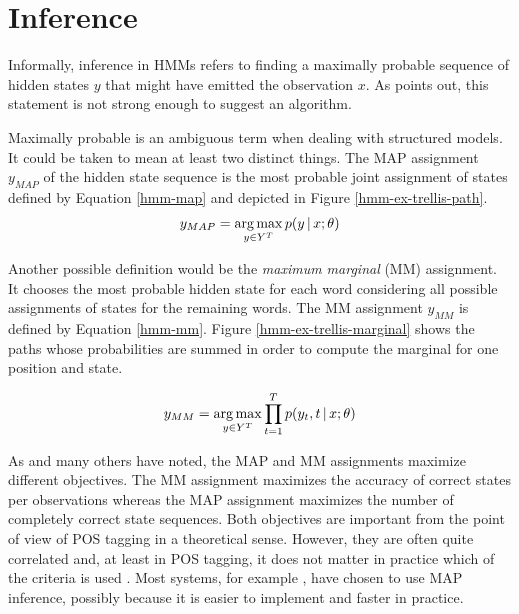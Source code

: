 \section{Inference}
Informally, inference in HMMs refers to finding a maximally
probable sequence of hidden states $y$ that might have emitted the
observation $x$. As \cite{Rabiner1989} points out, this statement is
not strong enough to suggest an algorithm. 

Maximally probable is an ambiguous term when dealing with structured
models. It could be taken to mean at least two distinct things. The
MAP assignment $y_{MAP}$ of the hidden state sequence is the most
probable joint assignment of states defined by Equation
\eqref{hmm-map} and depicted in Figure
\ref{hmm-ex-trellis-path}. 
\begin{equation}
y_{MAP} = \operatorname*{arg\,max}_{y\in Y^T} p(y\mbox{$ \, | \, $} x\mbox{$ ; \, $}\theta)\label{hmm-map}
\end{equation}

Another possible definition would be the
{\it maximum marginal} (MM) assignment. It chooses the most probable
hidden state for each word considering all possible assignments of states for the remaining words. The MM assignment $y_{MM}$ is defined by Equation
\eqref{hmm-mm}. Figure \ref{hmm-ex-trellis-marginal} shows the
paths whose probabilities are summed in order to compute the marginal for one position and state.


\begin{equation}
y_{MM} = \operatorname*{arg\,max}_{y\in Y^T} \prod_{t = 1}^T p(y_t, t \mbox{$ \, | \, $} x\mbox{$ ; \, $}\theta)\label{hmm-mm}
\end{equation}

As \cite{Merialdo1994} and many others have noted, the MAP and MM
assignments maximize different objectives. The MM assignment maximizes
the accuracy of correct states per observations whereas the MAP
assignment maximizes the number of completely correct state
sequences. Both objectives are important from the point of view of POS
tagging in a theoretical sense. However, they are often quite
correlated and, at least in POS tagging, it does not matter in
practice which of the criteria is used \citep{Merialdo1994}. Most
systems, for example \cite{Church1988,Brants2000,Halacsy2007}, have
chosen to use MAP inference, possibly because it is easier to
implement and faster in practice.

